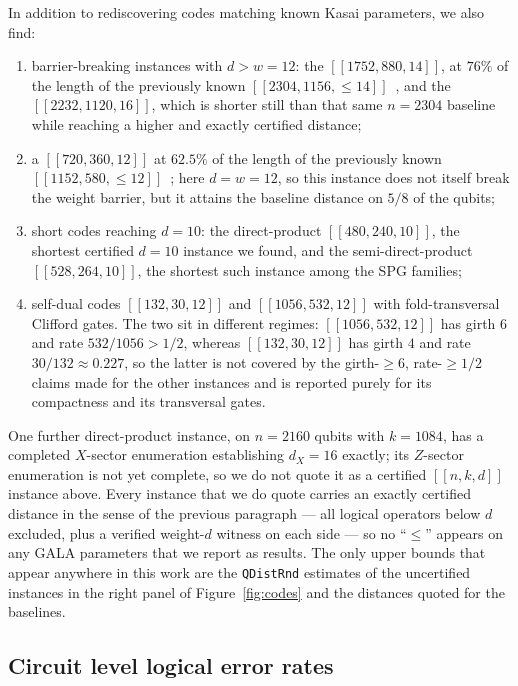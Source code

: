 In addition to rediscovering codes matching known Kasai parameters, we also find:

\begin{enumerate}
    \item barrier-breaking instances with $d>w=12$: the $[[1752, 880, 14]]$, at $76\%$ of the length of the previously known $[[2304, 1156, \leq 14]]$~\cite{zhao2026ultrahighratequantumerrorcorrection}, and the $[[2232, 1120, 16]]$, which is shorter still than that same $n=2304$ baseline while reaching a higher and exactly certified distance;
    \item a $[[720, 360, 12]]$ at $62.5\%$ of the length of the previously known $[[1152, 580, \leq 12]]$~\cite{zhao2026ultrahighratequantumerrorcorrection}; here $d = w = 12$, so this instance does not itself break the weight barrier, but it attains the baseline distance on $5/8$ of the qubits;
    \item short codes reaching $d = 10$: the direct-product $[[480,240,10]]$, the shortest certified $d=10$ instance we found, and the semi-direct-product $[[528,264,10]]$, the shortest such instance among the SPG families;
    \item self-dual codes $[[132,30,12]]$ and $[[1056, 532,12]]$ with fold-transversal Clifford gates. The two sit in different regimes: $[[1056,532,12]]$ has girth $6$ and rate $532/1056 > 1/2$, whereas $[[132,30,12]]$ has girth $4$ and rate $30/132 \approx 0.227$, so the latter is not covered by the girth-$\geq6$, rate-$\geq1/2$ claims made for the other instances and is reported purely for its compactness and its transversal gates.
\end{enumerate}

One further direct-product instance, on $n=2160$ qubits with $k=1084$, has a completed $X$-sector enumeration establishing $d_X=16$ exactly; its $Z$-sector enumeration is not yet complete, so we do not quote it as a certified $[[n,k,d]]$ instance above. Every instance that we do quote carries an exactly certified distance in the sense of the previous paragraph --- all logical operators below $d$ excluded, plus a verified weight-$d$ witness on each side --- so no ``$\leq$'' appears on any GALA parameters that we report as results. The only upper bounds that appear anywhere in this work are the \texttt{QDistRnd} estimates of the uncertified instances in the right panel of Figure~\ref{fig:codes} and the distances quoted for the baselines.


\subsection{Circuit level logical error rates}

